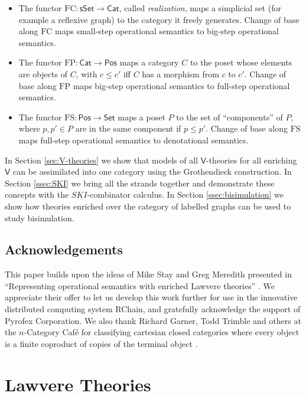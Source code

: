 \documentclass{amsart}
\theoremstyle{definition}
\newcommand{\sSet}{\mathsf{sSet}}
\newcommand{\Set}{\mathsf{Set}}
\newcommand{\Cat}{\mathsf{Cat}}
\newcommand{\Pos}{\mathsf{Pos}}
\newcommand{\V}{\mathsf{V}}
\newcommand{\FC}{\mathrm{FC}}
\newcommand{\FP}{\mathrm{FP}}
\newcommand{\FS}{\mathrm{FS}}
\newcommand{\maps}{\colon}
\begin{document}
\begin{itemize}
\item
The functor $\FC \maps \sSet \to \Cat$, called \textit{realization}, maps a simplicial set (for example a reflexive graph) to the category it freely generates.  Change of base along $\FC$ maps small-step operational semantics to big-step operational semantics.
\item 
The functor $\FP \maps \Cat \to \Pos$ maps a category $C$ to the poset whose elements are objects of $C$, with $c \le c'$ iff $C$ has a morphism from $c$ to $c'$.
Change of base along $\FP$ maps big-step operational semantics to full-step operational semantics.
\item 
The functor $\FS \maps \Pos \to \Set$ maps a poset $P$ to the set of ``components'' of $P$, where $p,p' \in P$ are in the same component if $p \le p'$. Change of base along $\FS$ maps full-step operational semantics to denotational semantics.
\end{itemize}

In Section \ref{sec:V-theories} we show that models of all $\V$-theories for all enriching $\V$ can be assimilated into one category using the Grothendieck construction.  In Section \ref{ssec:SKI} we bring all the strands together and demonstrate these concepts with the $SKI$-combinator calculus.  In Section \ref{ssec:bisimulation} we show how theories enriched over the category of labelled graphs can be used to study bisimulation.

\subsection*{Acknowledgements}

This paper builds upon the ideas of Mike Stay and Greg Meredith presented in ``Representing operational semantics with enriched Lawvere theories''  \cite{roswelt}.  We appreciate their offer to let us develop this work further for use in the innovative distributed computing system RChain, and gratefully acknowledge the support of Pyrofex Corporation.  We also thank Richard Garner, Todd Trimble and others at the $n$-Category Caf\'e for classifying cartesian closed categories where every object is a finite coproduct of copies of the terminal object \cite{nCafe}.

\section{Lawvere Theories}
\label{sec:lawvere}
\end{document}

